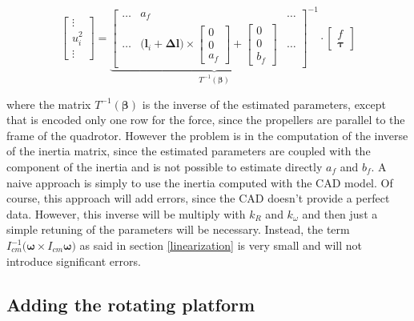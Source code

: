 \begin{equation}
	\begin{bmatrix}
		\vdots \\
		u_i^2 \\
		\vdots
	\end{bmatrix}
	=
	\underbrace{
	\begin{bmatrix}
		\dots   & a_f   & \dots  \\
		\dots & \Big(\mathbf{l}_i + \boldsymbol{\Delta l}\Big)\times\begin{bmatrix}0 \\ 0 \\ a_f \end{bmatrix}+\begin{bmatrix}0 \\ 0 \\ b_f\end{bmatrix} & \dots
	\end{bmatrix}^{-1}
	}_{T^{-1}(\boldsymbol{\beta})}	
	\cdot
	\begin{bmatrix}
		f \\
		\boldsymbol{\tau}
	\end{bmatrix}
	\label{eq:mixingMatrix}
\end{equation}

\noindent where the matrix $T^{-1}(\boldsymbol{\beta})$ is the inverse of the estimated parameters, except that is encoded only one row for the force, since the propellers are parallel to the frame of the quadrotor. However the problem is in the computation of the inverse of the inertia matrix, since the estimated parameters are coupled with the component of the inertia and is not possible to estimate directly $a_f$ and $b_f$. A naive approach is simply to use the inertia computed with the CAD model. Of course, this approach will add errors, since the CAD doesn't provide a perfect data. However, this inverse will be multiply with $k_R$ and $k_{\omega}$ and then just a simple retuning of the parameters will be necessary. Instead, the term $I_{cm}^{-1}\bigl(\boldsymbol{\omega}\times I_{cm}\boldsymbol{\omega}\bigl)$ as said in section \ref{linearization} is very small and will not introduce significant errors.


\subsection{Adding the rotating platform}

